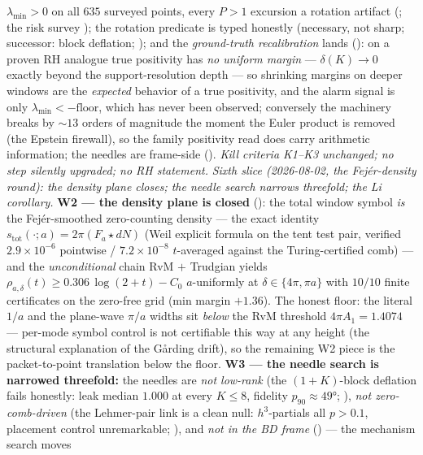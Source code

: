 \documentclass[11pt,a4paper]{article}
\begin{document}
$\lambda_{\min}>0$ on all $635$ surveyed points, every $P>1$
excursion a rotation artifact (; the
risk survey ); the rotation
predicate is typed honestly (necessary, not sharp; successor: block
deflation; ); and the
\emph{ground-truth recalibration} lands
(): on a proven RH analogue true
positivity has \emph{no uniform margin} --- $\delta(K)\to0$ exactly
beyond the support-resolution depth --- so shrinking margins on
deeper windows are the \emph{expected} behavior of a true
positivity, and the alarm signal is only
$\lambda_{\min}<-\mathrm{floor}$, which has never been observed;
conversely the machinery breaks by ${\sim}13$ orders of magnitude
the moment the Euler product is removed (the Epstein firewall), so
the family positivity read does carry arithmetic information; the
needles are frame-side ().  \emph{Kill
criteria K1--K3 unchanged; no step silently upgraded; no RH
statement.}
\emph{Sixth slice (2026-08-02, the Fej\'er-density round): the
density plane closes; the needle search narrows threefold; the Li
corollary.}  \textbf{W2 --- the density plane is closed}
(): the total window symbol \emph{is}
the Fej\'er-smoothed zero-counting density --- the exact identity
$s_{\mathrm{tot}}(\cdot;a)=2\pi(F_a\star dN)$ (Weil explicit formula
on the tent test pair, verified $2.9\times10^{-6}$ pointwise /
$7.2\times10^{-8}$ $t$-averaged against the Turing-certified comb)
--- and the \emph{unconditional} chain RvM $+$ Trudgian yields
$\rho_{a,\delta}(t)\ge0.306\,\log(2+t)-C_0$ $a$-uniformly at
$\delta\in\{4\pi,\pi a\}$ with $10/10$ finite certificates on the
zero-free grid (min margin $+1.36$).  The honest floor: the literal
$1/a$ and the plane-wave $\pi/a$ widths sit \emph{below} the RvM
threshold $4\pi A_1=1.4074$ --- per-mode symbol control is not
certifiable this way at any height (the structural explanation of
the G\aa rding drift), so the remaining W2 piece is the
packet-to-point translation below the floor.  \textbf{W3 --- the
needle search is narrowed threefold:} the needles are \emph{not
low-rank} (the $(1{+}K)$-block deflation fails honestly: leak median
$1.000$ at every $K\le8$, fidelity $p_{90}\approx49°$;
), \emph{not zero-comb-driven}
(the Lehmer-pair link is a clean null: $h^3$-partials all $p>0.1$,
placement control unremarkable;
), and \emph{not in the BD frame}
() --- the mechanism search moves
\end{document}
